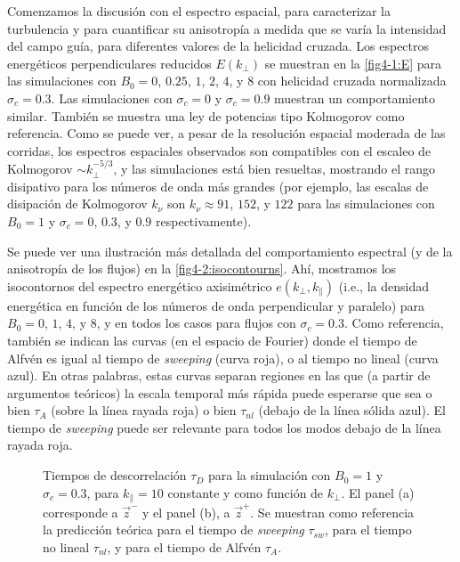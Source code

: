 Comenzamos la discusión con el espectro espacial, para caracterizar la
turbulencia y para cuantificar su anisotropía a medida que se varía la
intensidad del campo guía, para diferentes valores de la helicidad
cruzada.  Los espectros energéticos perpendiculares reducidos
$E(k_\perp)$ se muestran en la \cref{fig4-1:E} para las simulaciones con
$B_0=0$, $0.25$, $1$, $2$, $4$, y $8$ con helicidad cruzada
normalizada $\sigma_c=0.3$. Las simulaciones con $\sigma_c=0$ y
$\sigma_c=0.9$ muestran un comportamiento similar.  También se muestra
una ley de potencias tipo Kolmogorov como referencia. Como se puede
ver, a pesar de la resolución espacial moderada de las corridas, los
espectros espaciales observados son compatibles con el escaleo de
Kolmogorov $\sim k_\perp^{-5/3}$, y las simulaciones está bien
resueltas, mostrando el rango disipativo para los números de onda más
grandes (por ejemplo, las escalas de disipación de Kolmogorov $k_\nu$
son $k_\nu \approx 91$, $152$, y $122$ para las simulaciones con
$B_0 = 1$ y $\sigma_c = 0$, $0.3$, y $0.9$ respectivamente).

Se puede ver una ilustración más detallada del comportamiento
espectral (y de la anisotropía de los flujos) en la
\cref{fig4-2:isocontourns}. Ahí, mostramos los isocontornos del espectro
energético axisimétrico $e(k_\perp, k_\parallel)$ (i.e., la densidad
energética en función de los números de onda perpendicular y paralelo)
para $B_0=0$, $1$, $4$, y $8$, y en todos los casos para flujos con
$\sigma_c = 0.3$. Como referencia, también se indican las curvas (en
el espacio de Fourier) donde el tiempo de Alfvén es igual al tiempo
de \textit{sweeping} (curva roja), o al tiempo no lineal (curva
azul). En otras palabras, estas curvas separan regiones en las que (a
partir de argumentos teóricos) la escala temporal más rápida puede
esperarse que sea o bien $\tau_A$ (sobre la línea rayada roja) o bien
$\tau_{nl}$ (debajo de la línea sólida azul). El tiempo
de \textit{sweeping} puede ser relevante para todos los modos debajo
de la línea rayada roja.

\begin{figure}
  \centering
  \caption{Tiempos de descorrelación $\tau_D$ para la simulación con $B_0=1$ y $\sigma_c=0.3$, para $k_\parallel=10$ constante y como función de $k_\perp$. El panel (a) corresponde a $\vec{z}^-$ y el panel (b), a $\vec{z}^+$. Se muestran como referencia la predicción teórica para el tiempo de \textit{sweeping} $\tau_{sw}$, para el tiempo no lineal $\tau_{nl}$, y para el tiempo de Alfv\'en $\tau_A$.}
  \label{fig4-5:z+_vs_z-}
\end{figure}

